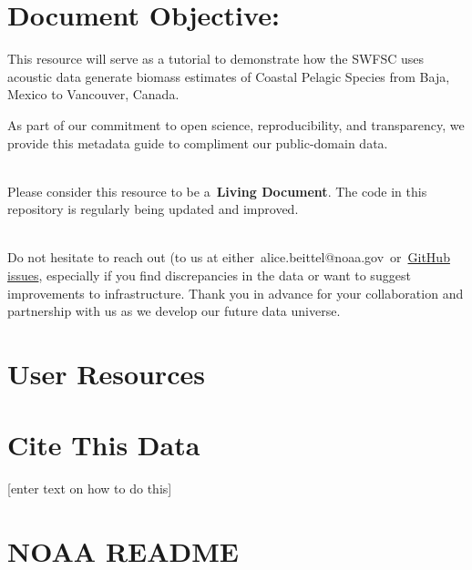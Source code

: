 \documentclass[
  letterpaper,
  oneside,
  open=any]{scrbook}
\begin{document}
\section*{Document Objective:}\label{document-objective}


This resource will serve as a tutorial to demonstrate how the SWFSC uses
acoustic data generate biomass estimates of Coastal Pelagic Species from
Baja, Mexico to Vancouver, Canada.

As part of our commitment to open science, reproducibility, and
transparency, we provide this metadata guide to compliment our
public-domain data.\\
\strut \\
Please consider this resource to be a~\textbf{Living Document}. The code
in this repository is regularly being updated and improved.~\\
\strut \\
Do not hesitate to reach out (to us at
either~alice.beittel@noaa.gov~or~\href{https://github.com/nmfs-swfsc-ast/echo-class/issues}{GitHub
issues}, especially if you find discrepancies in the data or want to
suggest improvements to infrastructure. Thank you in advance for your
collaboration and partnership with us as we develop our future data
universe.

\section*{User Resources}\label{user-resources}


\section*{Cite This Data}\label{cite-this-data}


{[}enter text on how to do this{]}

\section*{NOAA README}\label{noaa-readme}

\end{document}
